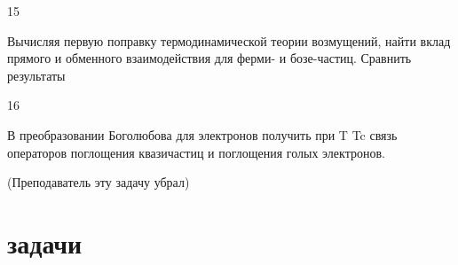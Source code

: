 \documentclass[a4paper,12pt]{article} %
\begin{document}
\begin{task}

15

Вычисляя первую поправку термодинамической теории возмущений, найти вклад прямого и обменного взаимодействия для ферми- и бозе-частиц. Сравнить результаты














\end{task}


\begin{task}

16

В преобразовании Боголюбова для электронов получить при T  Tc связь операторов поглощения квазичастиц и поглощения голых электронов.

(Преподаватель эту задачу убрал)












\end{task}



















\clearpage
\part{задачи}
\end{document}
